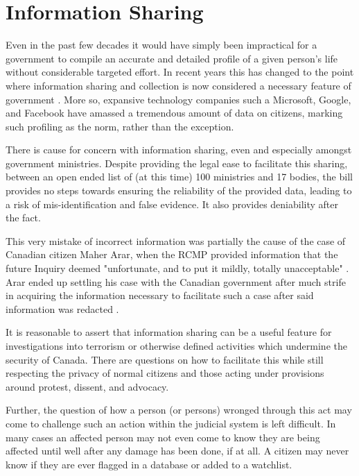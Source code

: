 \documentclass[a4paper, 11pt]{article} %
\begin{document}
\section*{Information Sharing}
Even in the past few decades it would have simply been impractical for a government to compile an accurate and detailed profile of a given person's life without considerable targeted effort. In recent years this has changed to the point where information sharing and collection is now considered a necessary feature of government \cite{total-awareness}. More so, expansive technology companies such a Microsoft, Google, and Facebook have amassed a tremendous amount of data on citizens, marking such profiling as the norm, rather than the exception.

There is cause for concern with information sharing, even and especially amongst government ministries. Despite providing the legal ease to facilitate this sharing, between an open ended list of (at this time) 100 ministries and 17 bodies, the bill provides no steps towards ensuring the reliability of the provided data, leading to a risk of mis-identification and false evidence. It also provides deniability after the fact.

This very mistake of incorrect information was partially the cause of the case of Canadian citizen Maher Arar, when the RCMP provided information that the future Inquiry deemed "unfortunate, and to put it mildly, totally unacceptable" \cite{arar}. Arar ended up settling his case with the Canadian government after much strife in acquiring the information necessary to facilitate such a case after said information was redacted \cite{arar_canada_2007}.

It is reasonable to assert that information sharing can be a useful feature for investigations into terrorism or otherwise defined activities which undermine the security of Canada. There are questions on how to facilitate this while still respecting the privacy of normal citizens and those acting under provisions around protest, dissent, and advocacy.

Further, the question of how a person (or persons) wronged through this act may come to challenge such an action within the judicial system is left difficult. In many cases an affected person may not even come to know they are being affected until well after any damage has been done, if at all. A citizen may never know if they are ever flagged in a database or added to a watchlist.
\end{document}
